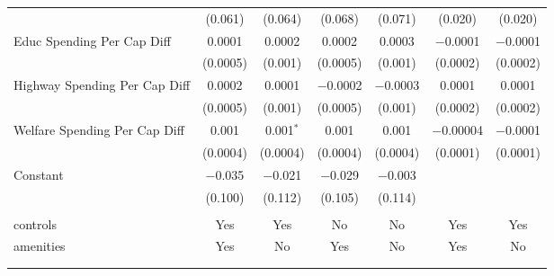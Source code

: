 \begin{table}[!htbp]
\begin{tabular}{@{\extracolsep{5pt}}lcccccc}
  & (0.061) & (0.064) & (0.068) & (0.071) & (0.020) & (0.020) \\ 
  Educ Spending Per Cap Diff & 0.0001 & 0.0002 & 0.0002 & 0.0003 & $-$0.0001 & $-$0.0001 \\ 
  & (0.0005) & (0.001) & (0.0005) & (0.001) & (0.0002) & (0.0002) \\ 
  Highway Spending Per Cap Diff & 0.0002 & 0.0001 & $-$0.0002 & $-$0.0003 & 0.0001 & 0.0001 \\ 
  & (0.0005) & (0.001) & (0.0005) & (0.001) & (0.0002) & (0.0002) \\ 
  Welfare Spending Per Cap Diff & 0.001 & 0.001$^{*}$ & 0.001 & 0.001 & $-$0.00004 & $-$0.0001 \\ 
  & (0.0004) & (0.0004) & (0.0004) & (0.0004) & (0.0001) & (0.0001) \\ 
  Constant & $-$0.035 & $-$0.021 & $-$0.029 & $-$0.003 &  &  \\ 
  & (0.100) & (0.112) & (0.105) & (0.114) &  &  \\ 
 \hline \\[-1.8ex] 
controls & Yes & Yes & No & No & Yes & Yes \\ 
amenities & Yes & No & Yes & No & Yes & No \\ 
\hline \\[-1.8ex] 
\hline 
\hline \\[-1.8ex] 
\end{tabular} 
\end{table} 
